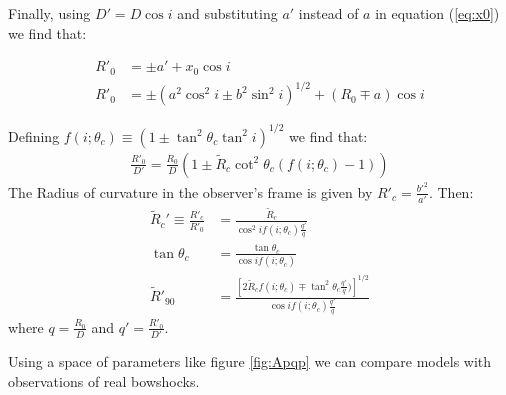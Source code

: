 Finally, using $D' = D\cos i$ and substituting $a'$ instead of $a$ in equation (\ref{eq:x0}) we find that: 

\begin{align}
R'_0 &= \pm a' + x_0\cos i \\
R'_0 &= \pm\left(a^2\cos^2 i \pm b^2\sin^2 i\right)^{1/2} +  (R_0 \mp a)\cos i
\end{align}

Defining  $f(i;\theta_c)\equiv\left(1\pm\tan^2\theta_c\tan^2i\right)^{1/2}$ we find that:
\begin{align}
\frac{R'_0}{D'}=\frac{R_0}{D}\left(1\pm \tilde{R}_c\cot^2\theta_c(f(i;\theta_c)-1) \right)
\label{eq:qprime}
\end{align}
The Radius of curvature in the observer's frame is given by $R'_c=\frac{b'^2}{a'}$. Then:
\begin{align}
  \tilde{R}_c'\equiv  \frac{R'_c}{R'_0} &= \frac{\tilde{R}_c}{\cos^2 i f(i;\theta_c)\frac{q'}{q}}
  \label{eq:Aprime}\\
  \tan\theta_c & = \frac{\tan\theta_c}{\cos i f(i;\theta_c)} \\
  \tilde{R}'_{90} &= \frac{\left[2\tilde{R}_cf(i;\theta_c) \mp \tan^2\theta_c\frac{q'}{q})\right]^{1/2}}{\cos i f(i;\theta_c)\frac{q'}{q}}
\end{align}
where $q=\frac{R_0}{D}$ and $q' = \frac{R'_0}{D'}$.



Using a space of parameters like figure \ref{fig:Apqp} we can compare models with observations of real bowshocks.


 

